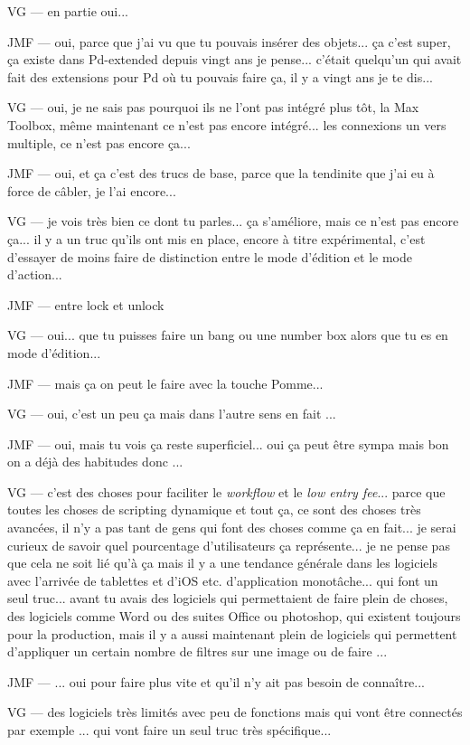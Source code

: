 VG — en partie oui... 

JMF — oui, parce que j'ai vu que tu pouvais insérer des objets... ça c'est super, ça existe dans Pd-extended depuis vingt ans je pense... c'était quelqu'un qui avait fait des extensions pour Pd où tu pouvais faire ça, il y a vingt ans je te dis...  

VG — oui, je ne sais pas pourquoi ils ne l'ont pas intégré plus tôt, la Max Toolbox, même maintenant ce n'est pas encore intégré... les connexions un vers multiple, ce n'est pas encore ça... 

JMF — oui, et ça c'est des trucs de base, parce que la tendinite que j'ai eu à force de câbler, je l'ai encore...  

VG — je vois très bien ce dont tu parles... ça s'améliore, mais ce n'est pas encore ça... il y a un truc qu'ils ont mis en place, encore à titre expérimental, c'est d'essayer de moins faire de distinction entre le mode d'édition et le mode d'action...  

JMF — entre lock et unlock 

VG — oui... que tu puisses faire un bang ou une number box alors que tu es en mode d'édition... 

JMF — mais ça on peut le faire avec la touche Pomme... 

VG — oui, c'est un peu ça mais dans l'autre sens en fait ... 

JMF — oui, mais tu vois ça reste superficiel... oui ça peut être sympa mais bon on a déjà des habitudes donc ... 

VG — c'est des choses pour faciliter le \textit{workflow} et le \textit{low entry fee}... parce que toutes les choses de scripting dynamique et tout ça, ce sont des choses très avancées, il n'y a pas tant de gens qui font des choses comme ça en fait... je serai curieux de savoir quel pourcentage d'utilisateurs ça représente... je ne pense pas que cela ne soit lié qu'à ça mais il y a une tendance générale dans les logiciels avec l'arrivée de tablettes et d'iOS etc. d'application monotâche... qui font un seul truc... avant tu avais des logiciels qui permettaient de faire plein de choses, des logiciels comme Word ou des suites Office ou photoshop, qui existent toujours pour la production, mais il y a aussi maintenant plein de logiciels qui permettent d'appliquer un certain nombre de filtres sur une image ou de faire ... 

JMF — ... oui pour faire plus vite et qu'il n'y ait pas besoin de connaître... 

VG — des logiciels très limités avec peu de fonctions mais qui vont être connectés par exemple ... qui vont faire un seul truc très spécifique... 

